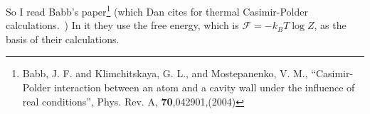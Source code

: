 So I read Babb's paper\footnote{Babb, J. F. and Klimchitskaya, G. L., and Mostepanenko, V. M., 
``Casimir-Polder interaction between an atom and a cavity wall under the influence of real conditions'',
 Phys. Rev. A, \textbf{70},042901,(2004)} (which Dan cites for thermal Casimir-Polder calculations.~\cite{Babb2004})
  In it they use the free energy, which is $\mathcal{F} = -k_BT\log Z$, as the basis of their calculations.








